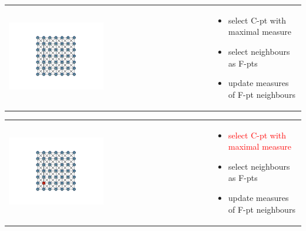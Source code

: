 \documentclass[12pt]{beamer}
\newcommand{\re}[1]{{\textcolor{red}       {#1}}}
\begin{document}
\begin{frame}

\begin{tabular}{ p{} p{}}

\hspace{5mm} \includegraphics[trim = 85mm 40mm 85mm  40mm, clip, width=0.48\textwidth]{AMG1.png} &

\vspace{-1.75in}

\begin{itemize}
  \item select C-pt with maximal measure
  \item select neighbours as F-pts
  \item update measures of F-pt neighbours

\end{itemize}

\end{tabular}

\end{frame}

\begin{frame}


\begin{tabular}{ p{} p{}}

\hspace{5mm} \includegraphics[trim = 85mm 40mm 85mm  40mm, clip, width=0.48\textwidth]{AMG2.png} &

\vspace{-1.75in}

\begin{itemize}
  \item \re{select C-pt with maximal measure}
  \item select neighbours as F-pts
  \item update measures of F-pt neighbours

\end{itemize}
\end{tabular}

\end{frame}
\end{document}
